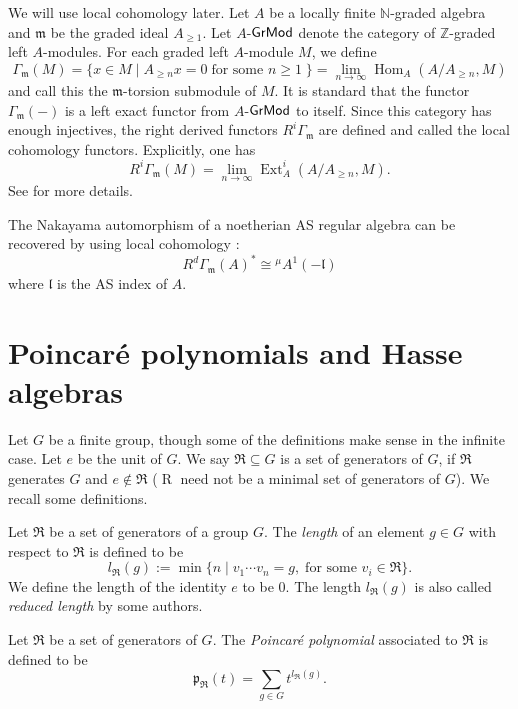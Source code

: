 We will use local cohomology later.
Let $A$ be a locally finite ${\mathbb N}$-graded algebra and 
${\mathfrak{m}}$ be the graded ideal $A_{\geq 1}$. Let $A$-$\operatorname{{\sf GrMod}}$ denote 
the category of ${\mathbb Z}$-graded left $A$-modules. For 
each graded left $A$-module $M$, we define
$$\Gamma_{\mathfrak{m}}(M) =\{ x\in M\mid A_{\geq n} x=0 \; {\text{for some $n\geq 1$}}\;\}
=\lim_{n\to \infty} \operatorname{Hom}_A(A/A_{\geq n}, M)$$
and call this the ${\mathfrak{m}}$-torsion submodule of $M$. It is 
standard that the functor $\Gamma_{\mathfrak{m}}(-)$ is a left 
exact functor from $A$-$\operatorname{{\sf GrMod}}$ to itself. Since this category 
has enough injectives, the right derived functors 
$R^i\Gamma_{\mathfrak{m}}$ are defined and called the local 
cohomology functors. Explicitly, one has 
$$R^i\Gamma_{\mathfrak{m}}(M)=\lim_{n\to \infty} \operatorname{Ext}^i_A(A/A_{\geq n}, M).$$ 
See \cite{AZ, VdB} for more details.

The Nakayama automorphism of a noetherian AS regular algebra can be 
recovered by using local cohomology \cite[Lemma 3.5]{RRZ2}:
\begin{equation}
\label{E1.2.3}\tag{E1.2.3}
R^d \Gamma_{\mathfrak{m}} (A)^*\cong {^\mu A^1}(-{\mathfrak l})
\end{equation}
where ${\mathfrak l}$ is the AS index of $A$. 

\section{Poincar{\'e}  polynomials and Hasse algebras}
\label{xxsec2}

Let $G$ be a finite group, though some of the definitions make
sense in the infinite case. Let $e$ be the unit of $G$. 
We say $\Re\subseteq G$ is a set of generators of $G$, if $\Re$ 
generates $G$ and $e\not\in \Re$ ($\operatorname{R}$ need not be a minimal set of generators of $G$). We recall some definitions.

\begin{definition}
\label{xxdef2.1}
Let $\Re$ be a set of generators of a group $G$.
The {\it length} of an element $g\in G$ with respect to 
$\Re$ is defined to be 
$${l_{\Re}}(g):=\min\{ n \mid v_1\cdots v_n=g, \; {\text{for some $v_i\in \Re$}}\}.$$
We define the length of the identity $e$ to be 0.  The length ${l_{\Re}}(g)$ is also called {\it reduced length} by some authors.
\end{definition}

\begin{definition}
\label{xxdef2.2}
Let $\Re$ be a set of generators of $G$.
The {\it Poincar{\'e} polynomial} associated to $\Re$ is defined to be
$${\mathfrak{p}}_\Re(t)=\sum_{g\in G} t^{{l_{\Re}}(g)}.$$
\end{definition}


